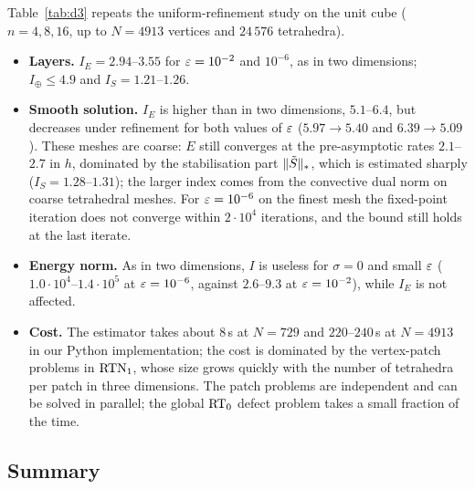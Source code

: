 Table~\ref{tab:d3} repeats the uniform-refinement study on the unit cube ($n=4,8,16$, up to $N=4913$
vertices and $24\,576$ tetrahedra).
\begin{itemize}
  \item \textbf{Layers.} $I_E=2.94$--$3.55$ for $\varepsilon=10^{-2}$ and $10^{-6}$, as in two dimensions; $I_\oplus\le4.9$
  and $I_S=1.21$--$1.26$.
  \item \textbf{Smooth solution.} $I_E$ is higher than in two dimensions, $5.1$--$6.4$, but decreases under
  refinement for both values of $\varepsilon$ ($5.97\to5.40$ and $6.39\to5.09$). These meshes are coarse: $E$ still
  converges at the pre-asymptotic rates $2.1$--$2.7$ in $h$, dominated by the stabilisation part
  $\|\tilde S\|_*$, which is estimated sharply ($I_S=1.28$--$1.31$); the larger index comes from the convective
  dual norm on coarse tetrahedral meshes. For $\varepsilon=10^{-6}$ on the finest mesh the fixed-point iteration does
  not converge within $2\cdot10^4$ iterations, and the bound still holds at the last iterate.
  \item \textbf{Energy norm.} As in two dimensions, $I$ is useless for $\sigma=0$ and small $\varepsilon$
  ($1.0\cdot10^4$--$1.4\cdot10^5$ at $\varepsilon=10^{-6}$, against $2.6$--$9.3$ at $\varepsilon=10^{-2}$), while $I_E$ is not
  affected.
  \item \textbf{Cost.} The estimator takes about $8$\,s at $N=729$ and $220$--$240$\,s at $N=4913$ in our
  Python implementation; the cost is dominated by the vertex-patch problems in $\mathrm{RTN}_1$, whose size grows
  quickly with the number of tetrahedra per patch in three dimensions. The patch problems are independent and
  can be solved in parallel; the global $\mathrm{RT}_0$ defect problem takes a small fraction of the time.
\end{itemize}



\subsection{Summary}

